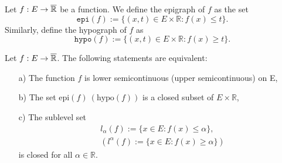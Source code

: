     \begin{definition}
        Let $f : E \to \overline{\mathbb{R}}$ be a function. We define the epigraph of $f$
        as the set
        \begin{equation*}
            \mathtt{epi}(f) := \{ (x, t) \in E \times \mathbb{R} : f(x) \leq t 
            \}.
        \end{equation*}
        Similarly, define the hypograph of $f$ as
        \begin{equation*}
            \mathtt{hypo}(f) := \{ (x,t) \in E \times \mathbb{R} : f(x) \geq t 
            \}.
        \end{equation*}
    \end{definition}
    
    \begin{theorem}
        Let $f: E \to \overline{\mathbb{R}}$. The following statements are equivalent:
        \begin{itemize}
            \item[a)]
                The function $f$ is lower semicontinuous (upper semicontinuous) 
                on E,
            \item[b)]
                The set $\text{epi}(f) \ (\text{hypo}(f))$ is a closed subset 
                of 
                $ E \times \mathbb{R}$,
            \item[c)]
                The sublevel set 
                \begin{align*}
                    & l_{\alpha}(f) := \{ x \in E : f(x) \leq \alpha \}, \\
                    & (l^{\alpha}(f) := \{ x \in E : f(x) \geq \alpha \})
                \end{align*}
                is closed for all $\alpha \in \mathbb{R}$.
        \end{itemize}
    \end{theorem}

